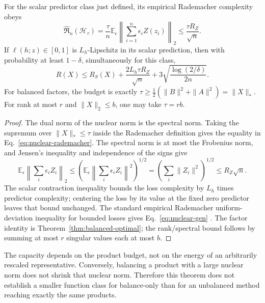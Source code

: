\begin{theorem}
\label{thm:nuclear-generalization}
For the scalar predictor class just defined, its empirical Rademacher
complexity obeys
\begin{equation}
 \widehat{\mathfrak R}_n(\mathcal H_\tau)
 =\frac{\tau}{n}\mathbb E_\epsilon
       \left\|\sum_{i=1}^n\epsilon_i Z(z_i)\right\|_2
 \leq\frac{\tau R_Z}{\sqrt n}.
 \label{eq:nuclear-rademacher}
\end{equation}
If $\ell(h;z)\in[0,1]$ is $L_h$-Lipschitz in its scalar prediction,
then with probability at least $1-\delta$, simultaneously for this class,
\begin{equation}
 R(X)\leq R_S(X)+\frac{2L_h\tau R_Z}{\sqrt n}
                   +3\sqrt{\frac{\log(2/\delta)}{2n}}.
 \label{eq:nuclear-gen}
\end{equation}
For balanced factors, the budget is exactly
$\tau\geq\tfrac12(\|B\|^2+\|A\|^2)=\|X\|_*$.
For rank at most $r$ and $\|X\|_2\leq b$, one may take $\tau=rb$.
\end{theorem}
\begin{proof}
The dual norm of the nuclear norm is the spectral norm. Taking the
supremum over $\|X\|_*\leq\tau$ inside the Rademacher definition gives
the equality in Eq.~\eqref{eq:nuclear-rademacher}. The spectral norm is
at most the Frobenius norm, and Jensen's inequality and independence of
the signs give
\begin{equation}
 \mathbb E_\epsilon\left\|\sum_i\epsilon_i Z_i\right\|_2
 \leq\left(\mathbb E_\epsilon\left\|\sum_i\epsilon_i Z_i\right\|^2\right)^{1/2}
 =\left(\sum_i\|Z_i\|^2\right)^{1/2}\leq R_Z\sqrt n.
\end{equation}
The scalar contraction inequality bounds the loss complexity by $L_h$
times predictor complexity; centering the loss by its value at the fixed
zero predictor leaves that bound unchanged. The standard empirical
Rademacher uniform-deviation inequality for bounded losses gives
Eq.~\eqref{eq:nuclear-gen} \cite{bartlett2002rademacher}.
The factor identity is Theorem~\ref{thm:balanced-optimal}; the rank/spectral
bound follows by summing at most $r$ singular values each at most $b$.
\end{proof}

The capacity depends on the product budget, not on the energy of an
arbitrarily rescaled representative. Conversely, balancing a product with
a large nuclear norm does not shrink that nuclear norm. Therefore this
theorem does not establish a smaller function class for balance-only than
for an unbalanced method reaching exactly the same products.

